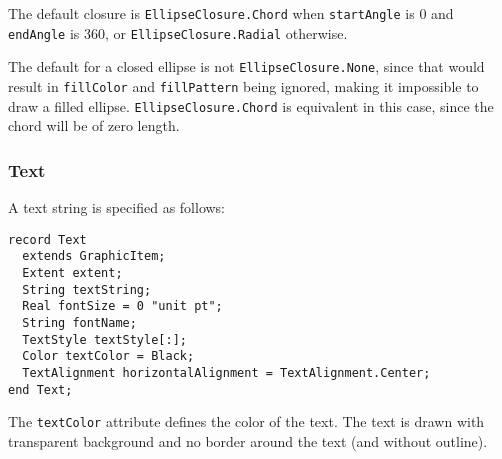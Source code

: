 The default closure is \lstinline!EllipseClosure.Chord! when \lstinline!startAngle! is 0 and \lstinline!endAngle! is 360, or \lstinline!EllipseClosure.Radial! otherwise.

\begin{nonnormative}
The default for a closed ellipse is not \lstinline!EllipseClosure.None!, since that would result in \lstinline!fillColor! and \lstinline!fillPattern! being ignored, making it impossible to draw a filled ellipse.
\lstinline!EllipseClosure.Chord! is equivalent in this case, since the chord will be of zero length.
\end{nonnormative}

\subsubsection{Text}\label{text}

A text string is specified as follows:
\begin{lstlisting}[language=modelica]
record Text
  extends GraphicItem;
  Extent extent;
  String textString;
  Real fontSize = 0 "unit pt";
  String fontName;
  TextStyle textStyle[:];
  Color textColor = Black;
  TextAlignment horizontalAlignment = TextAlignment.Center;
end Text;
\end{lstlisting}%
The \lstinline!textColor! attribute defines the color of the text.
The text is drawn with transparent background and no border around the text (and without outline).

